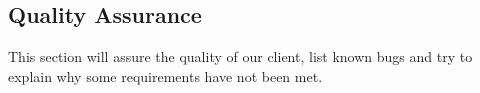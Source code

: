 \subsection{Quality Assurance}
This section will assure the quality of our client, list known bugs and try to explain why some requirements have not been met.



\newpage